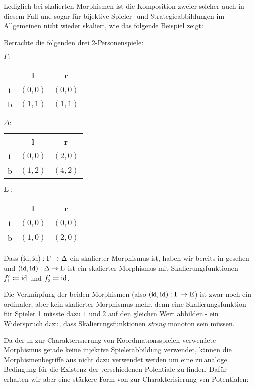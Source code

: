 Lediglich bei skalierten Morphismen ist die Komposition zweier solcher auch in diesem Fall und sogar für bijektive Spieler- und Strategieabbildungen im Allgemeinen nicht wieder skaliert, wie das folgende Beispiel zeigt:

\begin{bsp}\label{bsp:GegenbspKompositionSkMorphismen}
	Betrachte die folgenden drei 2-Personenspiele:
	\begin{center}
		$\Gamma:$ \quad
		\begin{tabular}{c||c|c}
			& l 		& r 		\\\hline\hline
			t	& $(0,0)$	& $(0,0)$	\\\hline
			b	& $(1,1)$	& $(1,1)$ 
		\end{tabular}\hspace{3em}
		$\Delta:$ \quad
		\begin{tabular}{c||c|c}
			& l 		& r 		\\\hline\hline
		t	& $(0,0)$	& $(2,0)$	\\\hline
		b	& $(1,2)$	& $(4,2)$ 
		\end{tabular}\hspace{3em}
		$\mathrm{E}:$ \quad
		\begin{tabular}{c||c|c}
			& l 		& r 		\\\hline\hline
			t	& $(0,0)$	& $(0,0)$	\\\hline
			b	& $(1,0)$	& $(2,0)$ 
		\end{tabular}
	\end{center}
	Dass $(\mathrm{id}, \mathrm{id}): \Gamma \to \Delta$ ein skalierter Morphismus ist, haben wir bereits in  gesehen und $(\mathrm{id}, \mathrm{id}): \Delta \to \mathrm{E}$ ist ein skalierter Morphismus mit Skalierungsfunktionen $f'_1 \coloneqq \mathrm{id}$ und $f'_2 \coloneqq \mathrm{id}$. 
	
	Die Verknüpfung der beiden Morphismen (also $(\mathrm{id}, \mathrm{id}): \Gamma \to \mathrm{E}$) ist zwar noch ein ordinaler, aber kein skalierter Morphismus mehr, denn eine Skalierungsfunktion für Spieler 1 müsste dazu $1$ und $2$ auf den gleichen Wert abbilden - ein Widerspruch dazu, dass Skalierungsfunktionen \emph{streng} monoton sein müssen.
\end{bsp}


Da der in  zur Charakterisierung von Koordinationsspielen verwendete Morphismus gerade keine injektive Spielerabbildung verwendet, können die Morphismenbegriffe aus  nicht dazu verwendet werden um eine zu  analoge Bedingung für die Existenz der verschiedenen Potentiale zu finden. Dafür erhalten wir aber eine stärkere Form von  zur Charakterisierung von Potentialen:

